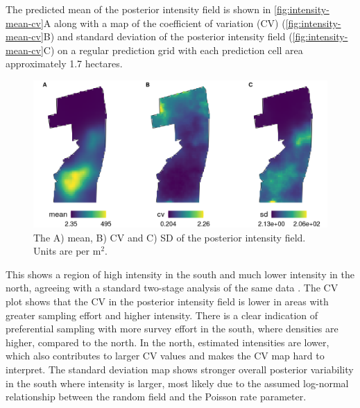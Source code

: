 \documentclass{stylefile16/statsoc}
\begin{document}
The predicted mean of the posterior intensity field is shown in \autoref{fig:intensity-mean-cv}A along with a map of the coefficient of variation (CV) (\autoref{fig:intensity-mean-cv}B) and standard deviation of the posterior intensity field (\autoref{fig:intensity-mean-cv}C) on a regular prediction grid with each prediction cell area approximately 1.7 hectares.
\begin{figure}[!htb]
	\begin{center}
		\includegraphics[scale=0.525]{figures/intensity_mean_cv_sd.png}
		\caption{The A) mean, B) CV and C) SD of the posterior intensity field.  Units are per m$^2$.}
		\label{fig:intensity-mean-cv}
	\end{center}
\end{figure}
This shows a region of high intensity in the south and much lower intensity in the north, agreeing with a standard two-stage analysis of the same data \citep{camp_dsm_2020}.  The CV plot shows that the CV in the posterior intensity field is lower in areas with greater sampling effort and higher intensity.  There is a clear indication of preferential sampling with more survey effort in the south, where densities are higher, compared to the north.  In the north, estimated intensities are lower, which also contributes to larger CV values and makes the CV map hard to interpret.  The standard deviation map shows stronger overall posterior variability in the south where intensity is larger, most likely due to the assumed log-normal relationship between the random field and the Poisson rate parameter.  
\end{document}
